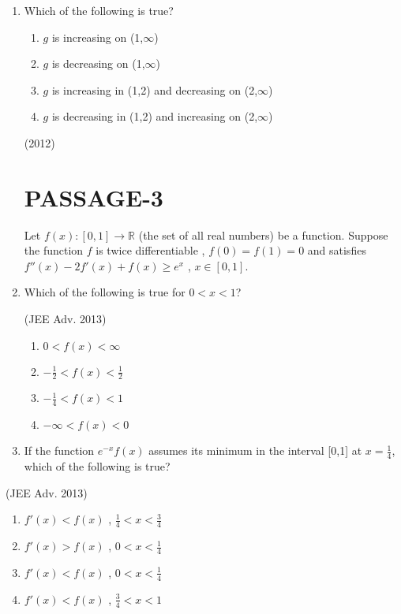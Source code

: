 \documentclass[journal,,12pt,twocolumn]{IEEEtran}
\theoremstyle{remark}
\begin{document}
\begin{enumerate}
\item Which of the following is true?
\begin{enumerate}[label=(\alph*)]
\item $g$ is increasing on (1,$\infty$)
\item $g$ is decreasing on (1,$\infty$)
\item $g$ is increasing in (1,2) and decreasing on (2,$\infty$)
\item $g$ is decreasing in (1,2) and increasing on (2,$\infty$)
\end{enumerate}
\hfill{(2012)}

\section*{PASSAGE-3}
Let $f(x) : [0,1] \to\mathbb{R}$
(the set of all real numbers) be a function. Suppose the function $f$ is twice differentiable , $f(0)=f(1)=0$ and satisfies $f''(x)-2f'(x)+f(x) \geq e^x$ , $x \in [0,1]$.

\item Which of the following is true for $0<x<1$?

\begin{flushright}
\hfill{(JEE Adv. 2013)}
\end{flushright}
\begin{enumerate}[label=(\alph*)]
\item $0<f(x)< \infty$
\item $ -\frac{1}{2} <f(x)< \frac{1}{2}$
\item $-\frac{1}{4}<f(x)<1$
\item $-\infty <f(x)<0$
\end{enumerate}


\item If the function $e^{-x}f(x)$ assumes its minimum in the interval [0,1] at $x=\frac{1}{4}$, which of the following is true?
\end{enumerate}
\begin{flushright}
\hfill{(JEE Adv. 2013)}
\end{flushright}
\begin{enumerate}[label=(\alph*)]
\item $f'(x)<f(x)$ , $\frac{1}{4}<x<\frac{3}{4}$ \\

\item $f'(x)>f(x)$ , $0<x<\frac{1}{4}$ \\ 

\item $f'(x)<f(x)$ , $0<x<\frac{1}{4}$ \\

\item $f'(x)<f(x)$ , $\frac{3}{4}<x<1$ \\
\end{enumerate}
\end{document}
